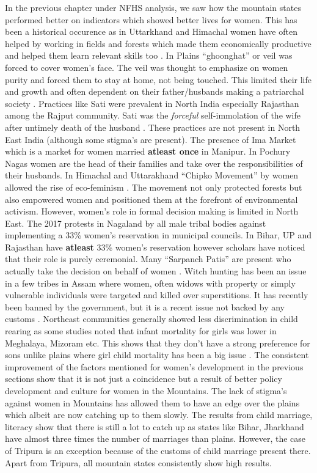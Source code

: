 In the previous chapter under NFHS analysis, we saw how the mountain states performed better on indicators which showed better lives for women. This has been a historical occurence as in Uttarkhand and Himachal women have often helped by  working in fields and forests which made them economically productive and helped them learn relevant skills too \citep{gooch2014daughters}. In Plains ``ghoonghat'' or veil was forced to cover women's face. The veil was thought to emphasize on women purity and forced them to stay at home, not being touched. This limited their life and growth and often dependent on their father/husbands making a patriarchal society \citep{chowdhry1993persistence}. Practices like Sati were prevalent in North India especially Rajasthan among the Rajput community. Sati was the \textit{forceful} self-immolation of the wife after  untimely death of the husband \citep{sangari1981sati}. These practices are not present in North East India (although some stigma's are present). The presence of Ima Market which is a market for  women married \textbf{atleast once} in Manipur. In Pochury Nagas women are the head of their families and take over the responsibilities of their husbands. In Himachal and Uttarakhand ``Chipko Movement'' by women allowed the rise of eco-feminism \citep{moore2011eco}. The movement not only protected forests but also empowered women and positioned them at the forefront of environmental activism.  However, women's role in formal decision making is limited in North East. The 2017 protests in Nagaland by all male tribal bodies against implementing a 33\% women's reservation in municipal councils.  In Bihar, UP and Rajasthan have \textbf{atleast} 33\% women's reservation however scholars have noticed that their role is purely ceremonial. Many ``Sarpanch Patis'' are present who actually take the decision on behalf of women \citep{rajasekhar2016women}. Witch hunting has been an issue in a few tribes in Assam where  women, often widows with property or simply vulnerable individuals were targeted and killed over superstitions. It has recently been banned by the government, but it is a recent issue not backed by any customs \citep{mishra2018targeting}.
Northeast communities generally showed less discrimination in child rearing as some studies noted that infant mortality for girls was lower in Meghalaya, Mizoram etc. This shows that they don't have a strong preference for sons unlike plains where girl child mortality has been a big issue \citep{mahanta2013gender}. The  consistent improvement of the factors mentioned for women's development in the previous sections show that it is not just a coincidence but a result of better policy development and culture for women in the Mountains. The lack of stigma's against women in Mountains has allowed them to have an edge over the plains which albeit are now catching up to them slowly. The results from child marriage, literacy show that there is still a lot to catch up as states like Bihar, Jharkhand have almost three times the number of marriages than plains. However, the case of Tripura is an exception because of the customs of child marriage present there. Apart from Tripura, all mountain states consistently show high results. 

